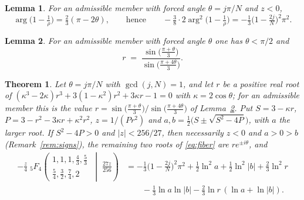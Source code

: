 \documentclass[10pt,a4paper]{amsart}
\newtheorem{lemma}{Lemma}
\newtheorem{theorem}{Theorem}
\begin{document}
\begin{lemma}\label{lem:angle}
For an admissible member with forced angle $\theta=j\pi/N$ and $z<0$,
\[
  \arg\!\big(1-\tfrac1\rho\big)=\tfrac23(\pi-2\theta),
  \qquad\text{hence}\qquad
  -\tfrac38\cdot 2\arg^2\!\big(1-\tfrac1\rho\big)=-\tfrac13\Big(1-\tfrac{2j}{N}\Big)^2\pi^2 .
\]
\end{lemma}

\begin{lemma}\label{lem:modulus}
For an admissible member with forced angle $\theta$ one has $\theta<\pi/2$ and
\[
  r\;=\;\frac{\sin\!\big(\tfrac{\pi+\theta}{3}\big)}{\sin\!\big(\tfrac{\pi+4\theta}{3}\big)} .
\]
\end{lemma}

\begin{theorem}\label{thm:main}
Let $\theta=j\pi/N$ with $\gcd(j,N)=1$, and let $r$ be a positive real root of
$(\kappa^3-2\kappa)r^3+3(1-\kappa^2)r^2+3\kappa r-1=0$ with $\kappa=2\cos\theta$; for an admissible
member this is the value $r=\sin\big(\tfrac{\pi+\theta}{3}\big)/\sin\big(\tfrac{\pi+4\theta}{3}\big)$
of Lemma~\textup{\ref{lem:modulus}}. Put
$S=3-\kappa r$, $P=3-r^2-3\kappa r+\kappa^2r^2$, $z=1/(Pr^2)$ and
$a,b=\tfrac12\big(S\pm\sqrt{S^2-4P}\big)$, with $a$ the larger root. If $S^2-4P>0$ and $|z|<256/27$,
then necessarily $z<0$ and $a>0>b$ (Remark~\textup{\ref{rem:signs}}), the remaining two roots of
\eqref{eq:fiber} are $re^{\pm i\theta}$, and
\begin{align*}
  -\frac{z}{4}\;{}_5F_4\!\left(\begin{matrix}1,1,1,\tfrac43,\tfrac53\\[2pt]
      \tfrac54,\tfrac32,\tfrac74,2\end{matrix}\;\middle|\;\frac{27z}{256}\right)
  &= -\frac13\Big(1-\frac{2j}{N}\Big)^2\pi^2
    + \tfrac12\ln^2 a+\tfrac12\ln^2|b|+\tfrac23\ln^2 r\\[2pt]
  &\qquad-\tfrac13\ln a\ln|b|-\tfrac23\ln r\,(\ln a+\ln|b|).
\end{align*}
\end{theorem}
\end{document}
